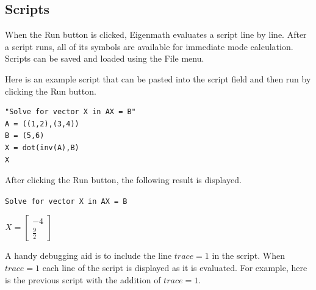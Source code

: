 \subsection{Scripts}

\begin{center}
\end{center}

\noindent
When the Run button is clicked, Eigenmath evaluates a script line by line.
After a script runs,
all of its symbols are available for immediate mode calculation.
Scripts can be saved and loaded using the File menu.

\bigskip
\noindent
Here is an example script that can be pasted into the script field
and then run by clicking the Run button.

\begin{Verbatim}[formatcom=\color{blue}]
"Solve for vector X in AX = B"
A = ((1,2),(3,4))
B = (5,6)
X = dot(inv(A),B)
X
\end{Verbatim}

\noindent
After clicking the Run button, the following result is displayed.

\bigskip
\noindent
\verb$Solve for vector X in AX = B$

\bigskip
\noindent
$\displaystyle X=\begin{bmatrix}-4\\ \frac{9}{2}\end{bmatrix}$

\bigskip
\noindent
A handy debugging aid is to include the line $trace=1$ in the script.
When $trace=1$ each line of the script is displayed as it is evaluated.
For example, here is the previous script with the addition of
$trace=1$.

